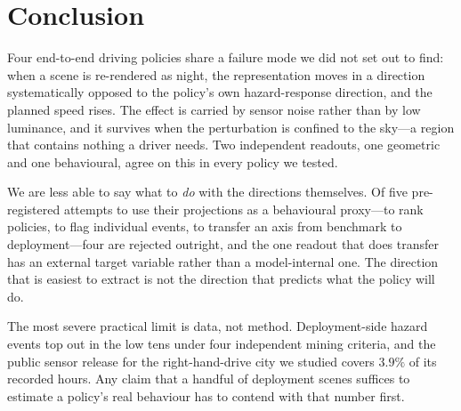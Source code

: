 \section{Conclusion}
\label{sec:conclusion}

Four end-to-end driving policies share a failure mode we did not set out to find: when a scene
is re-rendered as night, the representation moves in a direction systematically opposed to the
policy's own hazard-response direction, and the planned speed rises. The effect is carried by
sensor noise rather than by low luminance, and it survives when the perturbation is confined to
the sky---a region that contains nothing a driver needs. Two independent readouts, one
geometric and one behavioural, agree on this in every policy we tested.

We are less able to say what to \emph{do} with the directions themselves. Of five
pre-registered attempts to use their projections as a behavioural proxy---to rank policies, to
flag individual events, to transfer an axis from benchmark to deployment---four are rejected
outright, and the one readout that does transfer has an external target variable rather than a
model-internal one. The direction that is easiest to extract is not the direction that predicts
what the policy will do.

The most severe practical limit is data, not method. Deployment-side hazard events top out in
the low tens under four independent mining criteria, and the public sensor release for the
right-hand-drive city we studied covers $3.9\%$ of its recorded hours. Any claim that a handful
of deployment scenes suffices to estimate a policy's real behaviour has to contend with that
number first.
